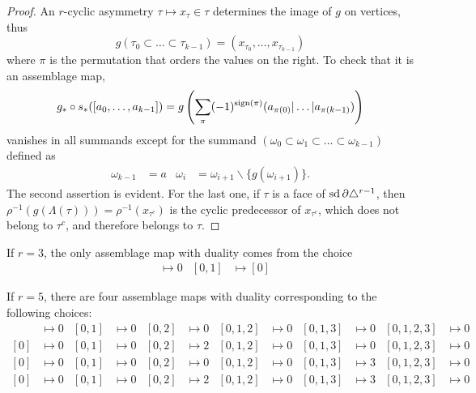 \begin{proof}
	An $r$-cyclic asymmetry $\tau\mapsto x_{\tau}\in \tau$ determines the image of $g$ on vertices, thus
	\[
	g(\tau_0\subset\ldots\subset\tau_{k-1}) = (x_{\tau_0},\ldots,x_{\tau_{k-1}})
	\]
	where $\pi$ is the permutation that orders the values on the right. To check that it is an assemblage map,
	\[
	g_*\circ s_*([a_0,\ldots,a_{k-1}]) = g\left(\sum_{\pi} (-1)^{\operatorname{sign}(\pi)} (a_{\pi(0)}|\ldots|a_{\pi(k-1)})\right)
	\]
	vanishes in all summands except for the summand $(\omega_0\subset \omega_1\subset \ldots\subset \omega_{k-1})$ defined as
	\begin{align*}
		\omega_{k-1} &= a
		&
		\omega_{i} &= \omega_{i+1}\smallsetminus \{g(\omega_{i+1})\}.
	\end{align*}
	The second assertion is evident. For the last one, if $\tau$ is a face of $\operatorname{sd} \partial \triangle^{r-1}$, then $\rho^{-1}(g(\Lambda(\tau))) = \rho^{-1}(x_{\tau^c})$ is the cyclic predecessor of $x_{\tau^c}$, which does not belong to $\tau^c$, and therefore belongs to $\tau$.
\end{proof}

\begin{example}
	If $r=3$, the only assemblage map with duality comes from the choice
	\begin{align*}
		[0]&\mapsto 0 & [0,1]&\mapsto [0]
	\end{align*}
\end{example}

\begin{example}\label{example:asymmetries5}
	If $r=5$, there are four assemblage maps with duality corresponding to the following choices:
	\begin{align*}
		[0]&\mapsto 0 & [0,1]&\mapsto 0 & [0,2]&\mapsto 0 & [0,1,2]&\mapsto 0 & [0,1,3] & \mapsto 0 & [0,1,2,3] & \mapsto 0 \\
		[0]&\mapsto 0 & [0,1]&\mapsto 0 & [0,2]&\mapsto 2 & [0,1,2]&\mapsto 0 & [0,1,3] & \mapsto 0 & [0,1,2,3] & \mapsto 0 \\
		[0]&\mapsto 0 & [0,1]&\mapsto 0 & [0,2]&\mapsto 0 & [0,1,2]&\mapsto 0 & [0,1,3] & \mapsto 3 & [0,1,2,3] & \mapsto 0 \\
		[0]&\mapsto 0 & [0,1]&\mapsto 0 & [0,2]&\mapsto 2 & [0,1,2]&\mapsto 0 & [0,1,3] & \mapsto 3 & [0,1,2,3] & \mapsto 0
	\end{align*}
\end{example}

